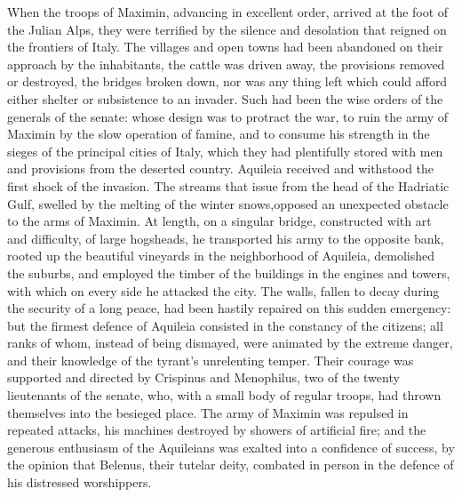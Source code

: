 When the troops of Maximin, advancing in excellent order, arrived
at the foot of the Julian Alps, they were terrified by the
silence and desolation that reigned on the frontiers of Italy.
The villages and open towns had been abandoned on their approach
by the inhabitants, the cattle was driven away, the provisions
removed or destroyed, the bridges broken down, nor was any thing
left which could afford either shelter or subsistence to an
invader. Such had been the wise orders of the generals of the
senate: whose design was to protract the war, to ruin the army of
Maximin by the slow operation of famine, and to consume his
strength in the sieges of the principal cities of Italy, which
they had plentifully stored with men and provisions from the
deserted country. Aquileia received and withstood the first shock
of the invasion. The streams that issue from the head of the
Hadriatic Gulf, swelled by the melting of the winter snows,\footnotemark[34]
opposed an unexpected obstacle to the arms of Maximin. At length,
on a singular bridge, constructed with art and difficulty, of
large hogsheads, he transported his army to the opposite bank,
rooted up the beautiful vineyards in the neighborhood of
Aquileia, demolished the suburbs, and employed the timber of the
buildings in the engines and towers, with which on every side he
attacked the city. The walls, fallen to decay during the security
of a long peace, had been hastily repaired on this sudden
emergency: but the firmest defence of Aquileia consisted in the
constancy of the citizens; all ranks of whom, instead of being
dismayed, were animated by the extreme danger, and their
knowledge of the tyrant’s unrelenting temper. Their courage was
supported and directed by Crispinus and Menophilus, two of the
twenty lieutenants of the senate, who, with a small body of
regular troops, had thrown themselves into the besieged place.
The army of Maximin was repulsed in repeated attacks, his
machines destroyed by showers of artificial fire; and the
generous enthusiasm of the Aquileians was exalted into a
confidence of success, by the opinion that Belenus, their tutelar
deity, combated in person in the defence of his distressed
worshippers.\footnotemark[35]


